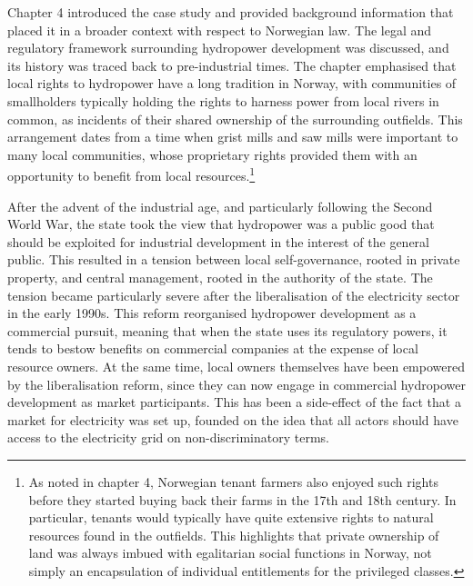 Chapter 4 introduced the case study and provided background information that placed it in a broader context with respect to Norwegian law. The legal and regulatory framework surrounding hydropower development was discussed, and its history was traced back to pre-industrial times. The chapter emphasised that local rights to hydropower have a long tradition in Norway, with communities of smallholders typically holding the rights to harness power from local rivers in common, as incidents of their shared ownership of the surrounding outfields. This arrangement dates from a time when grist mills and saw mills were important to many local communities, whose proprietary rights provided them with an opportunity to benefit from local resources.\footnote{As noted in chapter 4, Norwegian tenant farmers also enjoyed such rights before they started buying back their farms in the 17th and 18th century. In particular, tenants would typically have quite extensive rights to natural resources found in the outfields. This highlights that private ownership of land was always imbued with egalitarian social functions in Norway, not simply an encapsulation of individual entitlements for the privileged classes.} 

After the advent of the industrial age, and particularly following the Second World War, the state took the view that hydropower was a public good that should be exploited for industrial development in the interest of the general public. This resulted in a tension between local self-governance, rooted in private property, and central management, rooted in the authority of the state. The tension became particularly severe after the liberalisation of the electricity sector in the early 1990s. This reform reorganised hydropower development as a commercial pursuit, meaning that when the state uses its regulatory powers, it tends to bestow benefits on commercial companies at the expense of local resource owners. At the same time, local owners themselves have been empowered by the liberalisation reform, since they can now engage in commercial hydropower development as market participants. This has been a side-effect of the fact that a market for electricity was set up, founded on the idea that all actors should have access to the electricity grid on non-discriminatory terms.

